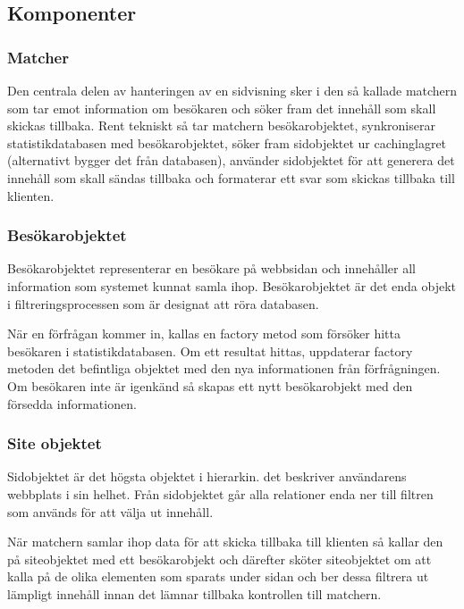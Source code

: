 \subsection{Komponenter}


\subsubsection{Matcher}

Den centrala delen av hanteringen av en sidvisning sker i den så kallade matchern som tar emot information om besökaren och söker fram det innehåll som skall skickas tillbaka. Rent tekniskt så tar matchern besökarobjektet, synkroniserar statistikdatabasen med besökarobjektet, söker fram sidobjektet ur cachinglagret (alternativt bygger det från databasen), använder sidobjektet för att generera det innehåll som skall sändas tillbaka och formaterar ett svar som skickas tillbaka till klienten.

\subsubsection{Besökarobjektet}

Besökarobjektet representerar en besökare på webbsidan och innehåller all information som systemet kunnat samla ihop. Besökarobjektet är det enda objekt i filtreringsprocessen som är designat att röra databasen.

När en förfrågan kommer in, kallas en factory metod som försöker hitta besökaren i statistikdatabasen. Om ett resultat hittas, uppdaterar factory metoden det befintliga objektet med den nya informationen från förfrågningen. Om besökaren inte är igenkänd så skapas ett nytt besökarobjekt med den försedda informationen.

\subsubsection{Site objektet}



Sidobjektet är det högsta objektet i hierarkin.  det beskriver användarens webbplats i sin helhet. Från sidobjektet går alla relationer enda ner till filtren som används för att välja ut innehåll.

När matchern samlar ihop data för att skicka tillbaka till klienten så kallar den på siteobjektet med ett besökarobjekt och därefter sköter siteobjektet om att kalla på de olika elementen som sparats under sidan och ber dessa filtrera ut lämpligt innehåll innan det lämnar tillbaka kontrollen till matchern.

